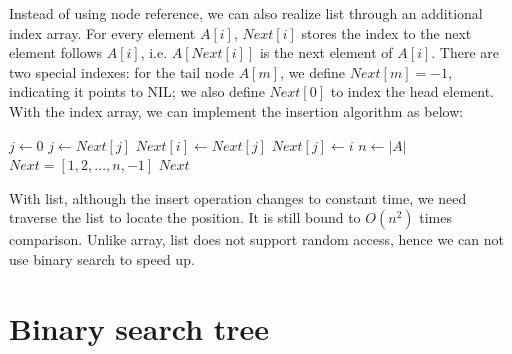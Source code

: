 \documentclass[b5paper]{article}
\begin{document}
\label{sec:list-index-array}
Instead of using node reference, we can also realize list through an additional index array. For every element $A[i]$, $Next[i]$ stores the index to the next element follows $A[i]$, i.e. $A[Next[i]]$ is the next element of $A[i]$. There are two special indexes: for the tail node $A[m]$, we define $Next[m] = -1$, indicating it points to NIL; we also define $Next[0]$ to index the head element. With the index array, we can implement the insertion algorithm as below:

\begin{algorithmic}[1]
  \State $j \gets 0$ 
    \State $j \gets Next[j]$
  \EndWhile
  \State $Next[i] \gets Next[j]$
  \State $Next[j] \gets i$
\EndFunction
\Statex
{}
  \State $n \gets |A|$
  \State $Next = [1, 2, ..., n, -1]$ 
    \State {}
  \EndFor
  \State \Return $Next$
\EndFunction
\end{algorithmic}

With list, although the insert operation changes to constant time, we need traverse the list to locate the position. It is still bound to $O(n^2)$ times comparison. Unlike array, list does not support random access, hence we can not use binary search to speed up.

\begin{Exercise}\label{ex:list-index-array-reorder}
\end{Exercise}

\begin{Answer}[ref = {ex:list-index-array-reorder}]
\end{Answer}

\section{Binary search tree}
\end{document}

